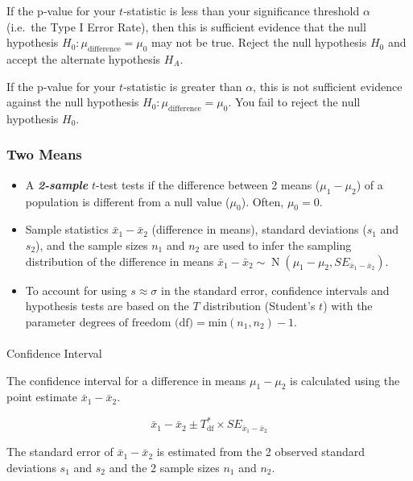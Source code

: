 \documentclass[
  letterpaper,
  DIV=11,
  numbers=noendperiod]{scrartcl}
\makeatletter
\let\oldparagraph\paragraph
\renewcommand{\paragraph}{
    \@ifstar
      \xxxParagraphStar
      \xxxParagraphNoStar
  }
\newcommand{\xxxParagraphStar}[1]{\oldparagraph*{#1}\mbox{}}
\newcommand{\xxxParagraphNoStar}[1]{\oldparagraph{#1}\mbox{}}
\makeatother
\begin{document}
If the p-value for your \(t\)-statistic is less than your significance
threshold \(\alpha\) (i.e.~the Type I Error Rate), then this is
sufficient evidence that the null hypothesis
\(H_0 \colon \mu_{\text{difference}}=\mu_0\) may not be true. Reject the
null hypothesis \(H_0\) and accept the alternate hypothesis \(H_A\).

If the p-value for your \(t\)-statistic is greater than \(\alpha\), this
is not sufficient evidence against the null hypothesis
\(H_0 \colon \mu_{\text{difference}}=\mu_0\). You fail to reject the
null hypothesis \(H_0\).

\subsubsection{Two Means}\label{two-means}

\begin{itemize}
\item
  A \textbf{\emph{2-sample}} \(t\)-test tests if the difference between
  2 means (\(\mu_1-\mu_2\)) of a population is different from a null
  value (\(\mu_0\)). Often, \(\mu_0=0\).
\item
  Sample statistics \(\bar{x}_1-\bar{x}_2\) (difference in means),
  standard deviations (\(s_1\) and \(s_2\)), and the sample sizes
  \(n_1\) and \(n_2\) are used to infer the sampling distribution of the
  difference in means
  \(\bar{x}_1-\bar{x}_2 \sim \operatorname{N}\left(\mu_1-\mu_2, SE_{\bar{x}_1-\bar{x}_2}\right)\).
\item
  To account for using \(s \approx \sigma\) in the standard error,
  confidence intervals and hypothesis tests are based on the \(T\)
  distribution (Student's \(t\)) with the parameter
  \(\text{degrees of freedom (df)}=\text{min}(n_1, n_2)-1\).
\end{itemize}

\paragraph{Confidence Interval}\label{confidence-interval-2}

The confidence interval for a difference in means \(\mu_1-\mu_2\) is
calculated using the point estimate \(\bar{x}_1-\bar{x}_2\).

\[
\bar{x}_1-\bar{x}_2 \pm T_{\text{df}}^* \times SE_{\bar{x}_1-\bar{x}_2}
\]

The standard error of \(\bar{x}_1-\bar{x}_2\) is estimated from the 2
observed standard deviations \(s_1\) and \(s_2\) and the 2 sample sizes
\(n_1\) and \(n_2\).
\end{document}
